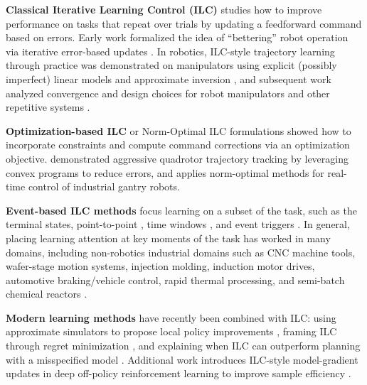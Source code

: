\documentclass[conference]{IEEEtran}
\begin{document}
\textbf{Classical Iterative Learning Control (ILC)} studies how to improve performance on tasks that repeat over trials by updating a feedforward command based on errors. Early work formalized the idea of ``bettering'' robot operation via iterative error-based updates \citep{arimoto_bettering_1984}. In robotics, ILC-style trajectory learning through practice was demonstrated on manipulators using explicit (possibly imperfect) linear models and approximate inversion \citep{atkeson_robot_1986,an_model-based_1988}, and subsequent work analyzed convergence and design choices for robot manipulators and other repetitive systems \citep{kuc_iterative_1991,moore_iterative_1992}.

\textbf{Optimization-based ILC} or Norm-Optimal ILC formulations showed how to incorporate constraints and compute command corrections via an optimization objective. \citet{schoellig_optimization-based_2012} demonstrated aggressive quadrotor trajectory tracking by leveraging convex programs to reduce errors, and \citet{4020374} applies norm-optimal methods for real-time control of industrial gantry robots.




\textbf{Event-based ILC methods} focus learning on a subset of the task, such as the terminal states\cite{chi2015adaptive}, point-to-point \cite{8013126}, time windows \cite{1384669}, and event triggers \cite{lin2020event}. In general, placing learning attention at key moments of the task has worked in many domains, including non-robotics industrial domains such as CNC machine tools, wafer-stage motion systems, injection molding, induction motor drives, automotive braking/vehicle control, rapid thermal processing, and semi-batch chemical reactors \cite{1636313}.


\textbf{Modern learning methods} have recently been combined with ILC: using approximate simulators to propose local policy improvements \citep{abbeel_using_2006}, framing ILC through regret minimization \citep{agarwal_regret_2021}, and explaining when ILC can outperform planning with a misspecified model \citep{vemula_effectiveness_2022}. Additional work introduces ILC-style model-gradient updates in deep off-policy reinforcement learning to improve sample efficiency \citep{gurumurthy_deep_2023}. 
\end{document}
